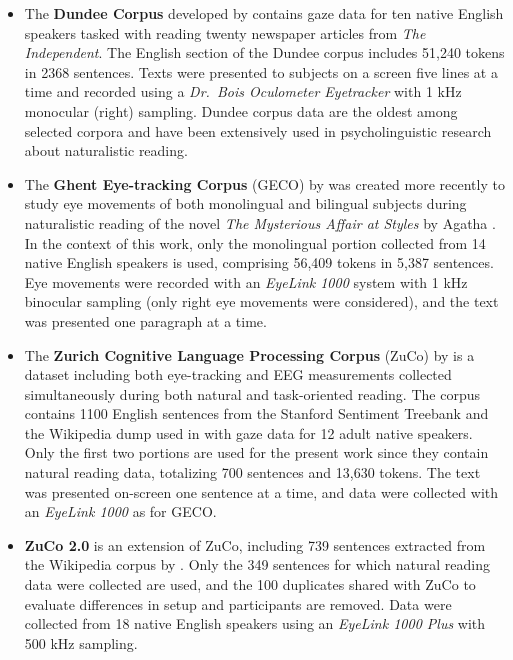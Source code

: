\documentclass[a4paper, nobind]{templates/ociamthesis}
\begin{document}
\begin{itemize}
\item
  The \textbf{Dundee Corpus} developed by \textcite{kennedy-etal-2003-dundee} contains gaze data for ten native English speakers tasked with reading twenty newspaper articles from \emph{The Independent}. The English section of the Dundee corpus includes 51,240 tokens in 2368 sentences. Texts were presented to subjects on a screen five lines at a time and recorded using a \emph{Dr.~Bois Oculometer Eyetracker} with 1 kHz monocular (right) sampling. Dundee corpus data are the oldest among selected corpora and have been extensively used in psycholinguistic research about naturalistic reading.
\item
  The \textbf{Ghent Eye-tracking Corpus} (GECO) by \textcite{cop-etal-2017-presenting} was created more recently to study eye movements of both monolingual and bilingual subjects during naturalistic reading of the novel \emph{The Mysterious Affair at Styles} by Agatha \textcite{christie-2003-mysterious}. In the context of this work, only the monolingual portion collected from 14 native English speakers is used, comprising 56,409 tokens in 5,387 sentences. Eye movements were recorded with an \emph{EyeLink 1000} system with 1 kHz binocular sampling (only right eye movements were considered), and the text was presented one paragraph at a time.
\item
  The \textbf{Zurich Cognitive Language Processing Corpus} (ZuCo) by \textcite{hollenstein-2018-zuco} is a dataset including both eye-tracking and EEG measurements collected simultaneously during both natural and task-oriented reading. The corpus contains 1100 English sentences from the Stanford Sentiment Treebank \autocite{socher-etal-2013-recursive} and the Wikipedia dump used in \textcite{culotta-etal-2006-integrating} with gaze data for 12 adult native speakers. Only the first two portions are used for the present work since they contain natural reading data, totalizing 700 sentences and 13,630 tokens. The text was presented on-screen one sentence at a time, and data were collected with an \emph{EyeLink 1000} as for GECO.
\item
  \textbf{ZuCo 2.0} is an extension of ZuCo, including 739 sentences extracted from the Wikipedia corpus by \textcite{culotta-etal-2006-integrating}. Only the 349 sentences for which natural reading data were collected are used, and the 100 duplicates shared with ZuCo to evaluate differences in setup and participants are removed. Data were collected from 18 native English speakers using an \emph{EyeLink 1000 Plus} with 500 kHz sampling.
\end{itemize}
\end{document}

